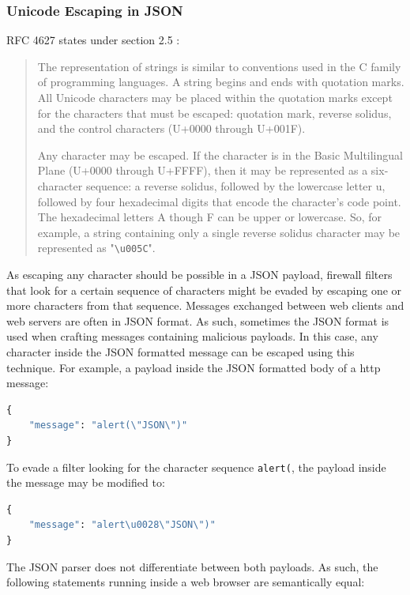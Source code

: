 \subsubsection{Unicode Escaping in JSON}
\label{sec:unicodeinjson}
RFC 4627  states under section 2.5 :
\begin{quote}
	The representation of strings is similar to conventions used in the C
	family of programming languages.  A string begins and ends with
	quotation marks.  All Unicode characters may be placed within the
	quotation marks except for the characters that must be escaped:
	quotation mark, reverse solidus, and the control characters (U+0000
	through U+001F).

	Any character may be escaped.  If the character is in the Basic
	Multilingual Plane (U+0000 through U+FFFF), then it may be
	represented as a six-character sequence: a reverse solidus, followed
	by the lowercase letter u, followed by four hexadecimal digits that
	encode the character's code point.  The hexadecimal letters A though
	F can be upper or lowercase.  So, for example, a string containing
	only a single reverse solidus character may be represented as
	"\verb|\u005C|". \cite{rfc4627}
\end{quote}
As escaping any character should be possible in a JSON payload, firewall filters that look for a certain sequence of characters might be evaded by escaping one or more characters from that sequence. Messages exchanged between web clients and web servers are often in JSON format. As such, sometimes the JSON format is used when crafting messages containing malicious payloads. In this case, any character inside the JSON formatted message can be escaped using this technique. For example, a payload inside the JSON formatted body of a \acrshort{http} message:

\begin{lstlisting}[style=basicStyle, language=Python]
{
	"message": "alert(\"JSON\")"
}
\end{lstlisting}
To evade a filter looking for the character sequence \verb|alert(|, the payload inside the message may be modified to:

\begin{lstlisting}[style=basicStyle, language=Python]
{
	"message": "alert\u0028\"JSON\")"
}
\end{lstlisting}
The JSON parser does not differentiate between both payloads. As such, the following statements running inside a web browser are semantically equal:


